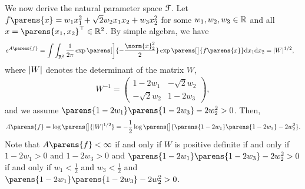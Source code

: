 	We now derive the natural parameter space $\mathcal{F}$. Let $f \parens{x} = w_1 x_1^2 + \sqrt{2} w_2 x_1 x_2 + w_3 x_2^2$ for some $w_1, w_2, w_3 \in \mathbb{R}$ and all $x = \parens{x_1, x_2}^\top \in \Real^2$. By simple algebra, we have 
	\begin{align*}
		e^{A \parens{f}} = & \, \int \int_{\Real^2} \frac{1}{2\pi} \exp \parens[\bigg]{- \frac{\norm{x}_2^2}{2}} \exp \parens[\big]{f \parens{x}} \diff x_1 \diff x_2 
		 = \abs{W}^{1/2}, 
	\end{align*}
	where $\lvert W\rvert$ denotes the determinant of the matrix $W$, 
	\begin{align*}
		W^{-1} = \begin{pmatrix}
			1 - 2w_1 & -\sqrt{2} w_2 \\ -\sqrt{2} w_2 & 1 - 2w_3
		\end{pmatrix}, 
	\end{align*}
	and we assume $\parens{1 - 2 w_1} \parens{1 - 2 w_3} - 2w_2^2 > 0$. Then, 
	\begin{align*}
		A \parens{f} = \log \parens[\big]{\abs{W}^{1/2}} = -\frac{1}{2} \log \parens[\big]{\parens{1 - 2w_1} \parens{1 - 2w_3} - 2 w_2^2}. 
	\end{align*}
	Note that $A \parens{f} < \infty$ if and only if $W$ is positive definite if and only if $1 - 2w_1 > 0$ and $1 - 2 w_3 > 0$ and $\parens{1 - 2w_1} \parens{1 - 2w_3} - 2 w_2^2 > 0$ if and only if $w_1 < \frac{1}{2}$ and $w_3 < \frac{1}{2}$ and $\parens{1 - 2w_1} \parens{1 - 2w_3} - 2 w_2^2 > 0$. 
	
